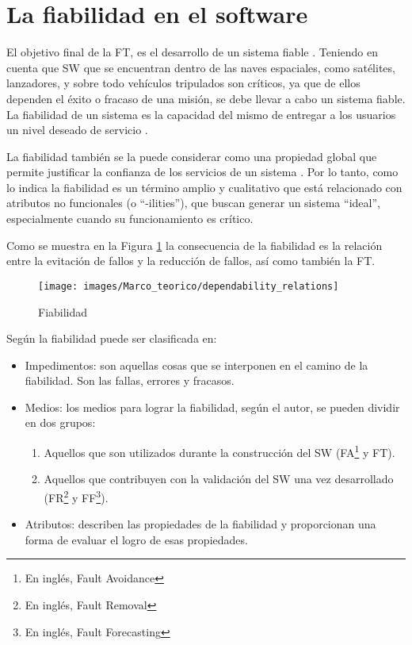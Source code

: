 \section{La fiabilidad en el software}
El objetivo final de la \ac{FT}, es el desarrollo de un sistema fiable \citep{FTDesign}. Teniendo 
en cuenta que \ac{SW} que se encuentran dentro de las naves espaciales, como satélites, 
lanzadores, y sobre todo vehículos tripulados son críticos, ya que de ellos dependen el éxito o 
fracaso de una misión, se debe llevar a cabo un sistema fiable. La fiabilidad de un sistema es la 
capacidad del mismo de entregar a los usuarios un nivel deseado de servicio \citep{FTDesign}. 

La fiabilidad también se la puede considerar como una propiedad global que permite justificar la 
confianza de los servicios de un sistema \citep{FTAvionics}. Por lo tanto, como lo indica 
\cite{FTAvionics} la fiabilidad es un término amplio y cualitativo que está relacionado con 
atributos no funcionales (o ``-ilities''), que buscan generar un sistema ``ideal'', especialmente 
cuando su funcionamiento es crítico. 

Como se muestra en la Figura \ref{fig:dependability_relations} la consecuencia de la fiabilidad es 
la relación entre la evitación de fallos y la reducción de fallos, así como también la \ac{FT}.

\begin{figure}[h]
 \centering
 \texttt{[image: images/Marco\_teorico/dependability\_relations]}
  \caption{Fiabilidad \protect\citep{FTAvionics}}  
\label{fig:dependability_relations} 
\end{figure}

Según \cite{Pullum01} la fiabilidad puede ser clasificada en:
\begin{itemize}
 \item Impedimentos: son aquellas cosas que se interponen en el camino de la fiabilidad. Son las 
fallas, errores y fracasos. 
 \item Medios: los medios para lograr la fiabilidad, según el autor, se pueden dividir en dos 
grupos:
  \begin{enumerate}
    \item Aquellos que son utilizados durante la construcción del \ac{SW} (\ac{FA}\footnote{En 
    inglés, Fault Avoidance} y \ac{FT}).
    \item Aquellos que contribuyen con la validación del \ac{SW} una vez desarrollado 
    (\ac{FR}\footnote{En inglés, Fault Removal} y \ac{FF}\footnote{En inglés, Fault Forecasting}).
  \end{enumerate}

 \item Atributos: describen las propiedades de la fiabilidad y proporcionan una forma de evaluar el 
logro de esas propiedades. 
\end{itemize}

